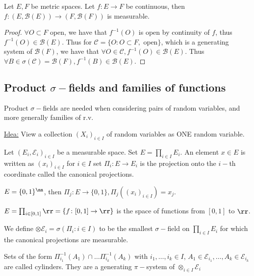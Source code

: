 \documentclass[../main.tex]{subfiles}
\begin{document}
\begin{proposition}
    Let $E, F$ be metric spaces. Let $f \colon E \to F$ be continuous, then \\ $f \colon (E,
    \mathcal{B}(E)) \to (F, \mathcal{B}(F))$ is measurable.
\end{proposition}
\begin{proof}
  $\forall O \subset F$ open, we have that $f^{-1}(O)$ is open by continuity of $f$, thus
  $f^{-1}(O) \in\mathcal{B}(E)$. Thus for $\mathcal{C} = \{ O \colon O \subset F, \text{ open}
  \} $, which is a generating system of $\mathcal{B}(F)$, we have that $\forall O \in
  \mathcal{C}, f^{-1}(O) \in \mathcal{B}(E)$. Thus $\forall B \in \sigma(\mathcal{C}) =
  \mathcal{B}(F), f^{-1}(B) \in \mathcal{B}(E)$.
\end{proof}

\subsection{Product $\sigma-$fields and families of functions}

Product $\sigma-$fields are needed when considering pairs of random variables, and more
generally families of r.v.

\vspace{0.5em}
\noindent \underline{\sffamily Idea:} View a collection $(X_i)_{i \in I}$ of random variables
as ONE random variable.

\begin{definition}
  Let $(E_i, \mathcal{E}_i)_{i \in I}$ be a measurable space. Set $E = \prod_{i \in I} E_i$.
  An element $x \in E$ is written as $(x_i)_{i \in I}$ for $i \in I$ set $\Pi_i \colon E \to
  E_i$ is the projection onto the $i-$th coordinate called the canonical projections.
\end{definition}

\begin{example}
    $E = \{ 0, 1 \} ^{\nn}$, then $\Pi_{j} \colon E \to \{ 0,1 \} , \Pi_j((x_i)_{i \in I}) =
    x_j$.
\end{example}
\begin{example}
  $E = \prod_{i \in [0, 1]} \rr = \{ f \colon [0, 1] \to \rr \} $ is the space of functions
  from $[0, 1]$ to $\rr$.
\end{example}

\begin{definition}
  We define $\otimes \mathcal{E}_i = \sigma(\Pi_i \colon i \in I)$ to be the smallest
  $\sigma-$field on $\prod_{i \in I}E_i$ for which the canonical projections are measurable.
\end{definition}
\begin{definition}
  Sets of the form $\Pi^{-1}_{i_1}(A_1) \cap \ldots \Pi_{i_k}^{-1}(A_k)$ with $i_1, \ldots, i_k
  \in I$, $A_1 \in \mathcal{E}_{i_1},\ldots, A_k \in \mathcal{E}_{i_k}$ are called cylinders.
  They are a generating $\pi-$system of $\otimes_{i \in I}\mathcal{E}_i$
\end{definition}
\end{document}

